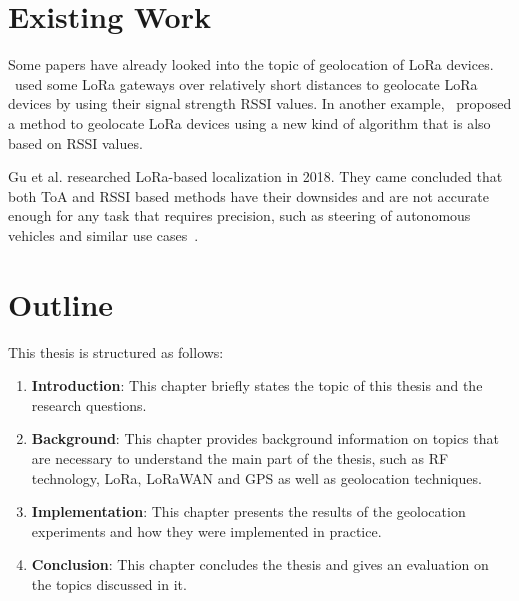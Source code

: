 \section{Existing Work}

Some papers have already looked into the topic of geolocation of \ac{LoRa} devices.
\cite{mackey_lora-based_2019}~used some \ac{LoRa} gateways over relatively short distances to geolocate \ac{LoRa} devices by using their signal strength RSSI values.
In another example,~\cite{lam_new_2018} proposed a method to geolocate \ac{LoRa} devices using a new kind of algorithm that is also based on RSSI values.

Gu et al. researched \ac{LoRa}-based localization in 2018.
They came concluded that both \ac{ToA} and \ac{RSSI} based methods have their downsides and are not accurate enough for any task that requires precision, such as steering of autonomous vehicles and similar use cases~\cite{gu_lora-based_2018}.

\section{Outline}

This thesis is structured as follows:

\begin{enumerate}
    \item \textbf{Introduction}:
          This chapter briefly states the topic of this thesis and the research questions.
    \item \textbf{Background}:
          This chapter provides background information on topics that are necessary to understand the main part of the thesis, such as \ac{RF} technology, \ac{LoRa}, \ac{LoRaWAN} and \ac{GPS} as well as geolocation techniques.
    \item \textbf{Implementation}:
          This chapter presents the results of the geolocation experiments and how they were implemented in practice.
    \item \textbf{Conclusion}:
          This chapter concludes the thesis and gives an evaluation on the topics discussed in it.
\end{enumerate}